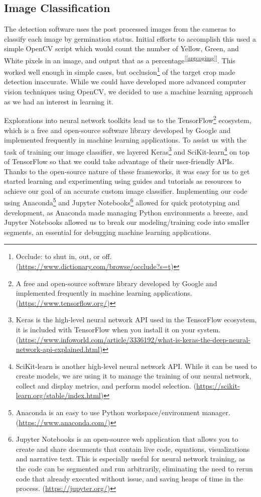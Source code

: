 \documentclass[11pt, twoside]{report}
\newcommand{\refapp}[1]{\textsuperscript{[\ref{#1}]}}
\begin{document}
\subsection{Image Classification}
The detection software uses the post processed images from the cameras to classify each image by germination status. Initial efforts to accomplish this used a simple OpenCV script which would count the number of Yellow, Green, and White pixels in an image, and output that as a percentage\refapp{app:ogimg}. This worked well enough in simple cases, but occlusion\footnote{Occlude: to shut in, out, or off. (\url{https://www.dictionary.com/browse/occlude?s=t})} of the target crop made detection inaccurate. While we could have developed more advanced computer vision techniques using OpenCV, we decided to use a machine learning approach as we had an interest in learning it. 

Explorations into neural network toolkits lead us to the TensorFlow\footnote{A free and open-source software library developed by Google and implemented frequently in machine learning applications. (\url{https://www.tensorflow.org/})} ecosystem, which is a free and open-source software library developed by Google and implemented frequently in machine learning applications. To assist us with the task of training our image classifier, we layered Keras\footnote{Keras is the high-level neural network API used in the TensorFlow ecosystem, it is included with TensorFlow when you install it on your system. (\url{https://www.infoworld.com/article/3336192/what-is-keras-the-deep-neural-network-api-explained.html})} and SciKit-learn\footnote{SciKit-learn is another high-level neural network API. While it can be used to create models, we are using it to manage the training of our neural network, collect and display metrics, and perform model selection. (\url{https://scikit-learn.org/stable/index.html})} on top of TensorFlow so that we could take advantage of their user-friendly APIs. Thanks to the open-source nature of these frameworks, it was easy for us to get started learning and experimenting using guides and tutorials as resources to achieve our goal of an accurate custom image classifier. Implementing our code using Anaconda\footnote{Anaconda is an easy to use Python workspace/environment manager. (\url{https://www.anaconda.com/})} and Jupyter Notebooks\footnote{Jupyter Notebooks is an open-source web application that allows you to create and share documents that contain live code, equations, visualizations and narrative text. This is especially useful for neural network training, as the code can be segmented and run arbitrarily, eliminating the need to rerun code that already executed without issue, and saving heaps of time in the process. (\url{https://jupyter.org/})} allowed for quick prototyping and development, as Anaconda made managing Python environments a breeze, and Jupyter Notebooks allowed us to break our modeling/training code into smaller segments, an essential for debugging machine learning applications. 
\end{document}
